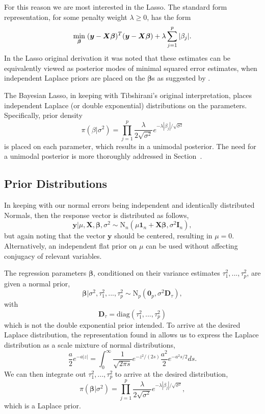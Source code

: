 \documentclass{uwstat572}
\begin{document}
For this reason we are most interested in the Lasso. The standard form representation, for some penalty weight $\lambda \geq 0$, has the form \[
\min_{\boldsymbol{\beta}}  \hspace{.1cm} (\boldsymbol{y}-\boldsymbol{X}\boldsymbol{\beta})^T(\boldsymbol{y}-\boldsymbol{X}\boldsymbol{\beta})+\lambda\sum_{j=1}^p|\beta_j|.
\] In the Lasso original derivation it was noted that these estimates can be equivalently viewed as posterior modes of minimal squared error estimates, when independent Laplace priors are placed on the $\boldsymbol{\beta}$s as suggested by \cite{tibshirani1996regression}.

The Bayesian Lasso, in keeping with Tibshirani's original interpretation, places independent Laplace (or double exponential) distributions on the parameters. Specifically, prior density \[
\pi(\beta|\sigma^2)=\prod_{j=1}^p\frac{\lambda}{2\sqrt{\sigma^2}}e^{-\lambda |\beta_j|/\sqrt{\sigma^2}}
\] is placed on each parameter, which results in a unimodal posterior. The need for a unimodal posterior is more thoroughly addressed in Section~\cite{unimodal}.

\subsection{Prior Distributions}
In keeping with our normal errors being independent and identically distributed Normals, then the response vector is distributed as follows, \[
\mathbf{y}|\mu,\mathbf{X},\boldsymbol\beta,\sigma^2 \sim \text{N}_n(\mu \mathbf{1}_n+\mathbf{X}\boldsymbol\beta,\sigma^2\mathbf{I}_n), \] but again noting that the vector $\mathbf{y}$ should be centered, resulting in $\mu=0$. Alternatively, an independent flat prior on $\mu$ can be used without affecting conjugacy of relevant variables.

The regression parameters $\boldsymbol\beta$, conditioned on their variance estimates $\tau_1^2,...,\tau_p^2$, are given a normal prior, \[ 
\boldsymbol\beta|\sigma^2,\tau^2_1,...,\tau^2_p\sim\text{N}_p(\mathbf{0}_p,\sigma^2\mathbf{D}_\tau),\] with \[ \mathbf{D}_\tau=\text{diag}(\tau_1^2,...,\tau^2_p) \] which is not the double exponential prior intended. To arrive at the desired Laplace distribution, the representation found in \cite{andrews1974scale} allows us to express the Laplace distribution as a scale mixture of normal distributions, \[ \frac{a}{2}e^{-a|z|}=\int^\infty_0
\frac{1}{\sqrt{2\pi s}}e^{-z^2/(2s)}\frac{a^2}{2}e^{-a^2s/2}ds.\] We can then integrate out $\tau^2_1,...,\tau^2_p$ to arrive at the desired distribution, \[ \pi(\boldsymbol\beta|\sigma^2)=\prod^p_{j=1}\frac{\lambda}{2\sqrt{\sigma^2}}e^{-\lambda|\beta_j|/\sqrt{\sigma^2}}, \] which is a Laplace prior. 
\end{document}
